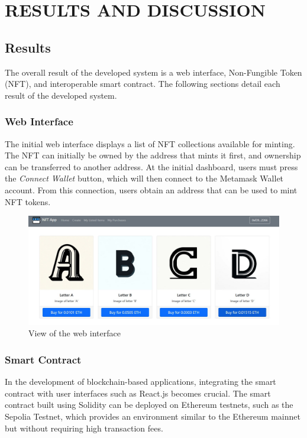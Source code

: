 \section{RESULTS AND DISCUSSION}
\label{sec:results}
\subsection{Results}
The overall result of the developed system is a web interface, Non-Fungible Token (NFT), and interoperable smart contract. The following sections detail each result of the developed system.

\subsubsection{Web Interface}
The initial web interface displays a list of NFT collections available for minting. The NFT can initially be owned by the address that mints it first, and ownership can be transferred to another address.
At the initial dashboard, users must press the \emph{Connect Wallet} button, which will then connect to the Metamask Wallet account. From this connection, users obtain an address that can be used to mint NFT tokens.

\begin{figure}[H] \centering
  \includegraphics[scale=0.17]{gambar/tampilan_aplikasi.jpeg}
  \caption{View of the web interface}
  \label{fig:web_view}
\end{figure}

\subsubsection{Smart Contract}
In the development of blockchain-based applications, integrating the smart contract with user interfaces such as React.js becomes crucial. The smart contract built using Solidity can be deployed on Ethereum testnets, such as the Sepolia Testnet, which provides an environment similar to the Ethereum mainnet but without requiring high transaction fees.

